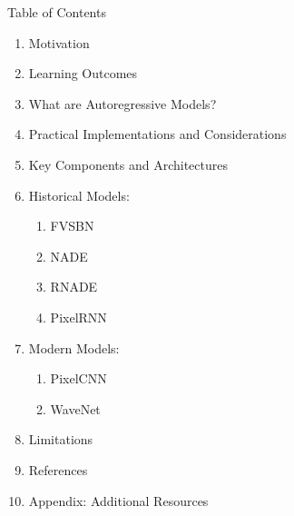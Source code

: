 \begin{frame}[allowframebreaks]{Table of Contents}
\begin{enumerate}
    \item Motivation
    \item Learning Outcomes
    \item What are Autoregressive Models?
    \item Practical Implementations and Considerations
    \item Key Components and Architectures
    \item Historical Models:
    \begin{enumerate} 
        \item FVSBN
        \item NADE
        \item RNADE
        \item PixelRNN
    \end{enumerate}
    \item Modern Models: 
    \begin{enumerate} 
        \item PixelCNN
        \item WaveNet
    \end{enumerate}
    \item Limitations
    \item References
    \item Appendix: Additional Resources
\end{enumerate}
\end{frame}